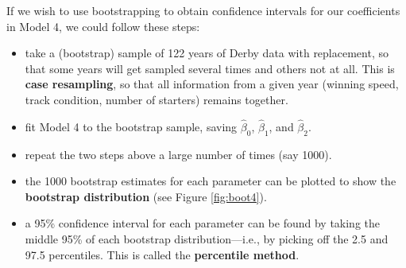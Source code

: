 \documentclass[
]{krantz}
\newenvironment{Shaded}{\begin{snugshade}}{\end{snugshade}}
\newcommand{\CommentTok}[1]{\textcolor[rgb]{0.37,0.37,0.37}{\textit{#1}}}
\newcommand{\DataTypeTok}[1]{\textcolor[rgb]{0.27,0.27,0.27}{#1}}
\newcommand{\DecValTok}[1]{\textcolor[rgb]{0.06,0.06,0.06}{#1}}
\newcommand{\FloatTok}[1]{\textcolor[rgb]{0.06,0.06,0.06}{#1}}
\newcommand{\KeywordTok}[1]{\textcolor[rgb]{0.27,0.27,0.27}{\textbf{#1}}}
\newcommand{\NormalTok}[1]{#1}
\newcommand{\OperatorTok}[1]{\textcolor[rgb]{0.43,0.43,0.43}{\textbf{#1}}}
\newcommand{\StringTok}[1]{\textcolor[rgb]{0.5,0.5,0.5}{#1}}
\providecommand{\tightlist}{%
  \setlength{\itemsep}{0pt}\setlength{\parskip}{0pt}}
\begin{document}
If we wish to use bootstrapping to obtain confidence intervals for our coefficients in Model 4, we could follow these steps:

\begin{itemize}
\tightlist
\item
  take a (bootstrap) sample of 122 years of Derby data with replacement, so that some years will get sampled several times and others not at all. This is \textbf{case resampling},  so that all information from a given year (winning speed, track condition, number of starters) remains together.
\item
  fit Model 4 to the bootstrap sample, saving \(\hat{\beta}_0\), \(\hat{\beta}_1\), and \(\hat{\beta}_2\).
\item
  repeat the two steps above a large number of times (say 1000).
\item
  the 1000 bootstrap estimates for each parameter can be plotted to show the \textbf{bootstrap distribution}  (see Figure \ref{fig:boot4}).
\item
  a 95\% confidence interval for each parameter can be found by taking the middle 95\% of each bootstrap distribution---i.e., by picking off the 2.5 and 97.5 percentiles. This is called the \textbf{percentile method}. 
\end{itemize}

\begin{Shaded}
\end{Shaded}
\end{document}
